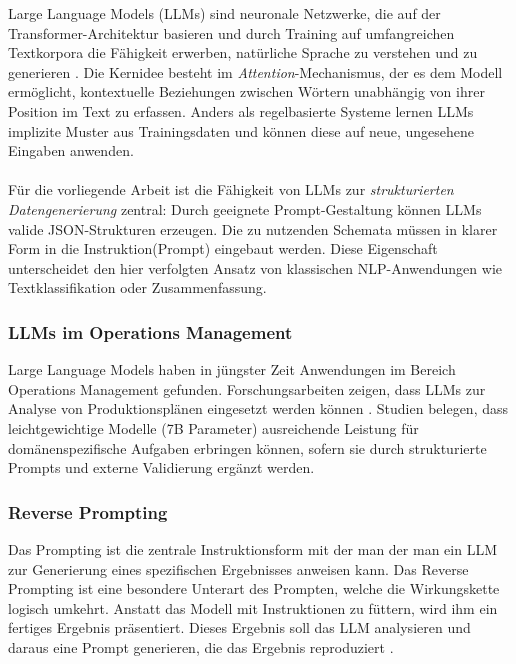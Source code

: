 Large Language Models (LLMs) sind neuronale Netzwerke, die auf der Transformer-Architektur basieren und durch Training auf umfangreichen Textkorpora die Fähigkeit erwerben, natürliche Sprache zu verstehen und zu generieren \citep{vaswani:attention2017}. Die Kernidee besteht im \textit{Attention}-Mechanismus, der es dem Modell ermöglicht, kontextuelle Beziehungen zwischen Wörtern unabhängig von ihrer Position im Text zu erfassen. Anders als regelbasierte Systeme lernen LLMs implizite Muster aus Trainingsdaten und können diese auf neue, ungesehene Eingaben anwenden.
\\\\
Für die vorliegende Arbeit ist die Fähigkeit von LLMs zur \textit{strukturierten Datengenerierung} zentral: Durch geeignete Prompt-Gestaltung können LLMs valide JSON-Strukturen erzeugen. Die zu nutzenden Schemata müssen in klarer Form in die Instruktion(Prompt) eingebaut werden. Diese Eigenschaft unterscheidet den hier verfolgten Ansatz von klassischen NLP-Anwendungen wie Textklassifikation oder Zusammenfassung.

\subsubsection{LLMs im Operations Management}
\label{subsubsec:LLMOperations}

Large Language Models haben in jüngster Zeit Anwendungen im Bereich Operations Management gefunden. Forschungsarbeiten zeigen, dass LLMs zur Analyse von Produktionsplänen eingesetzt werden können \citep{smartaps2025, fan:ai_for_or2024}. Studien belegen, dass leichtgewichtige Modelle (7B Parameter) ausreichende Leistung für domänenspezifische Aufgaben erbringen können, sofern sie durch strukturierte Prompts und externe Validierung ergänzt werden.

\subsubsection{Reverse Prompting}
\label{subsubsec:RevPrompt}
Das Prompting ist die zentrale Instruktionsform mit der man der man ein LLM zur Generierung eines spezifischen Ergebnisses anweisen kann. Das Reverse Prompting ist eine besondere Unterart des Prompten, welche die Wirkungskette logisch umkehrt. Anstatt das Modell mit Instruktionen zu füttern, wird ihm ein fertiges Ergebnis präsentiert. Dieses Ergebnis soll das LLM analysieren und daraus eine Prompt generieren, die das Ergebnis reproduziert \citep{li2025reversepromptengineering}.

